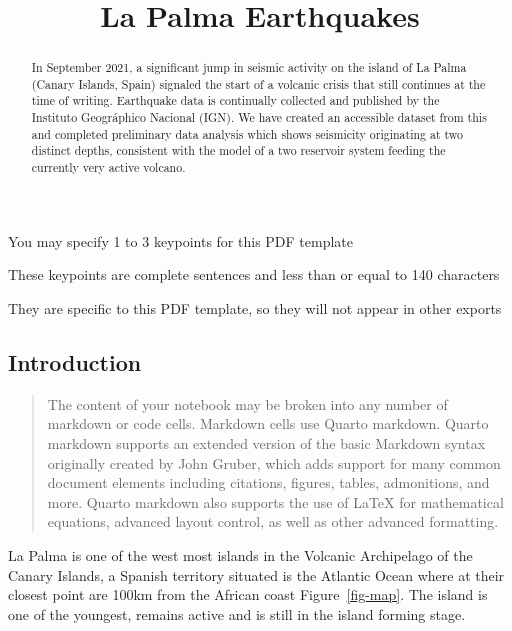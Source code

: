 \documentclass[
]{agujournal2019}
\begin{document}
\title{La Palma Earthquakes}


\begin{keypoints}
\item You may specify 1 to 3 keypoints for this PDF template \item These
keypoints are complete sentences and less than or equal to 140
characters \item They are specific to this PDF template, so they will
not appear in other exports 
\end{keypoints}

\begin{abstract}
In September 2021, a significant jump in seismic activity on the island
of La Palma (Canary Islands, Spain) signaled the start of a volcanic
crisis that still continues at the time of writing. Earthquake data is
continually collected and published by the Instituto Geográphico
Nacional (IGN). We have created an accessible dataset from this and
completed preliminary data analysis which shows seismicity originating
at two distinct depths, consistent with the model of a two reservoir
system feeding the currently very active volcano.
\end{abstract}



\hypertarget{introduction}{%
\subsection{Introduction}\label{introduction}}

\begin{quote}
The content of your notebook may be broken into any number of markdown
or code cells. Markdown cells use Quarto markdown. Quarto markdown
supports an extended version of the basic Markdown syntax originally
created by John Gruber, which adds support for many common document
elements including citations, figures, tables, admonitions, and more.
Quarto markdown also supports the use of LaTeX for mathematical
equations, advanced layout control, as well as other advanced
formatting.
\end{quote}

La Palma is one of the west most islands in the Volcanic Archipelago of
the Canary Islands, a Spanish territory situated is the Atlantic Ocean
where at their closest point are 100km from the African coast
Figure~\ref{fig-map}. The island is one of the youngest, remains active
and is still in the island forming stage.
\end{document}
